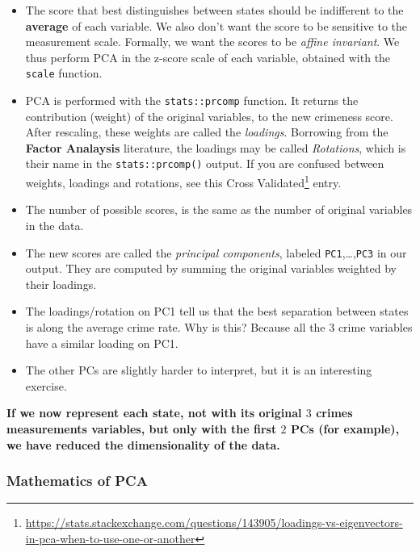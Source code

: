 \documentclass[]{book}
\renewcommand{\href}[2]{#2\footnote{\url{#1}}}
\theoremstyle{definition}
\theoremstyle{definition}
\theoremstyle{definition}
\theoremstyle{remark}
\begin{document}
\begin{itemize}
\item
  The score that best distinguishes between states should be indifferent to the \textbf{average} of each variable.
  We also don't want the score to be sensitive to the measurement scale.
  Formally, we want the scores to be \emph{affine invariant}.
  We thus perform PCA in the z-score scale of each variable, obtained with the \texttt{scale} function.
\item
  PCA is performed with the \texttt{stats::prcomp} function.
  It returns the contribution (weight) of the original variables, to the new crimeness score. After rescaling, these weights are called the \emph{loadings}.
  Borrowing from the \textbf{Factor Analaysis} literature, the loadings may be called \emph{Rotations}, which is their name in the \texttt{stats::prcomp()} output. If you are confused between weights, loadings and rotations, see this \href{https://stats.stackexchange.com/questions/143905/loadings-vs-eigenvectors-in-pca-when-to-use-one-or-another}{Cross Validated} entry.
\item
  The number of possible scores, is the same as the number of original variables in the data.
\item
  The new scores are called the \emph{principal components}, labeled \texttt{PC1},\ldots{},\texttt{PC3} in our output. They are computed by summing the original variables weighted by their loadings.
\item
  The loadings/rotation on PC1 tell us that the best separation between states is along the average crime rate.
  Why is this?
  Because all the \(3\) crime variables have a similar loading on PC1.
\item
  The other PCs are slightly harder to interpret, but it is an interesting exercise.
\end{itemize}

\textbf{If we now represent each state, not with its original \(3\) crimes measurements variables, but only with the first \(2\) PCs (for example), we have reduced the dimensionality of the data.}

\hypertarget{mathematics-of-pca}{%
\subsubsection{Mathematics of PCA}\label{mathematics-of-pca}}
\end{document}
